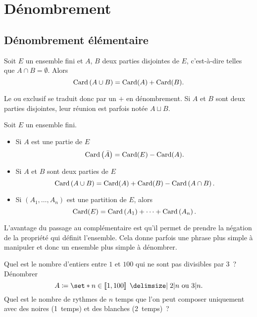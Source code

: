 \documentclass{magnolia}
\begin{document}
\section{Dénombrement}

\subsection{Dénombrement élémentaire}

\begin{proposition}
Soit $E$ un ensemble fini et $A$, $B$ deux parties disjointes de $E$, c'est-à-dire telles
que $A\cap B=\emptyset$. Alors
\[\operatorname{Card}\left(A\cup B\right)=\operatorname{Card} (A)+\operatorname{Card}(B).\]
\end{proposition}

\begin{remarqueUnique}
\remarque Le \og ou exclusif \fg se traduit donc par un $ + $ en dénombrement.
\remarque Si $A$ et $B$ sont deux parties disjointes, leur réunion est parfois notée $A\sqcup B$.
\end{remarqueUnique}

\begin{proposition}
Soit $E$ un ensemble fini.
\begin{itemize}
\item Si $A$ est une partie de $E$
  \[\operatorname{Card}\left(\bar{A}\right)=\operatorname{Card}(E)-\operatorname{Card}(A).\]
\item Si $A$ et $B$ sont deux parties de $E$
  \[\operatorname{Card}\left(A\cup B\right)=\operatorname{Card}(A)+\operatorname{Card}(B)-\operatorname{Card}\left(A\cap B\right).\]
\item Si $(A_1,\ldots,A_n)$ est une partition de $E$, alors
  \[\operatorname{Card}(E)=\operatorname{Card}\left(A_1\right)+\cdots+\operatorname{Card}\left(A_n\right).\]
\end{itemize}
\end{proposition}



\begin{remarqueUnique}
\remarque L'avantage du passage au complémentaire est qu'il permet de prendre la négation
  de la propriété qui définit l'ensemble. Cela donne parfois une phrase plus simple à
  manipuler et donc un ensemble plus simple à dénombrer.
\end{remarqueUnique}

\begin{exos}
\exo Quel est le nombre d'entiers entre $1$ et $100$ qui ne sont pas divisibles par $3$~?
\exo Dénombrer \[A\defeq\enstq{n \in \intere{1}{100}}{2 |n \text{ ou } 3 |n}.\]
\exo Quel est le nombre de rythmes de $n$ temps que l'on peut composer uniquement avec
  des noires (1~temps) et des blanches (2~temps)~?
\end{exos}
\end{document}
